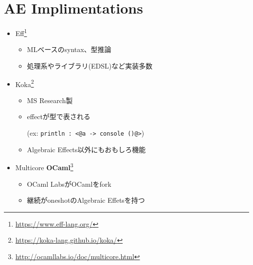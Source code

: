 \section{AE Implimentations}
\begin{frame}[fragile]
    \frametitlesec

    \begin{itemize}
        \item Eff\footnote{\url{https://www.eff-lang.org/}}

            \begin{itemize}
                \item MLベースのsyntax、型推論
                \item 処理系やライブラリ(EDSL)など実装多数
            \end{itemize}

        \item Koka\footnote{\url{https://koka-lang.github.io/koka/}}

            \begin{itemize}
                \item MS Research製
                \item effectが型で表される

                    (ex: \lstinline{println : <@a -> console ()@>})
                \item Algebraic Effects以外にもおもしろ機能
            \end{itemize}

        \item Multicore \textbf{OCaml}\footnote{\url{http://ocamllabs.io/doc/multicore.html}}

            \begin{itemize}
                \item OCaml LabsがOCamlをfork
                \item 継続が\alert{oneshot}のAlgebraic Effetsを持つ
            \end{itemize}
    \end{itemize}
\end{frame}

